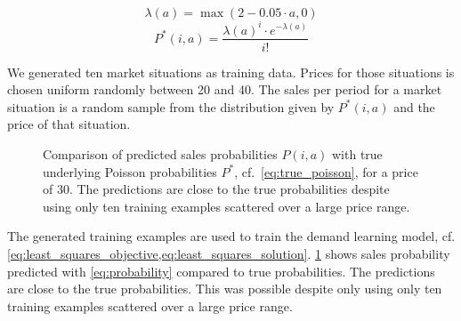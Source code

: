 \begin{equation}
\lambda(a) = \max(2 - 0.05 \cdot a, 0)
\end{equation}
\begin{equation}
P^*(i, a) = \frac{\lambda(a)^i \cdot e^{-\lambda(a)}}{i!}
\label{eq:true_poisson}
\end{equation}

We generated ten market situations as training data.
Prices for those situations is chosen uniform randomly between 20 and 40.
The sales per period for a market situation is a random sample from the distribution given by $P^*(i, a)$ and the price of that situation.

\begin{figure}[t]
	\caption[Comparison of Predicted Probabilites with Underlying Poisson Probabilities]{Comparison of predicted sales probabilities $P(i,a)$ with true underlying Poisson probabilities $P^*$, cf.~\cref{eq:true_poisson}, for a price of 30. The predictions are close to the true probabilities despite using only ten training examples scattered over a large price range.}
	\label{fig:probs_poisson}
\end{figure}

The generated training examples are used to train the demand learning model, cf. \cref{eq:least_squares_objective,eq:least_squares_solution}.
\cref{fig:probs_poisson} shows sales probability predicted with \cref{eq:probability} compared to true probabilities.
The predictions are close to the true probabilities.
This was possible despite only using only ten training examples scattered over a large price range.

